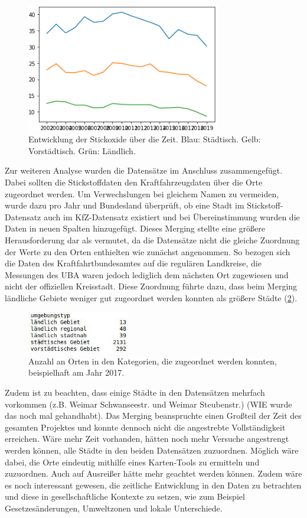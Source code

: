 \documentclass[11pt,a4paper,oneside,german]{article}
\begin{document}
	\begin{figure}[h!]
		\centering
		\includegraphics[width=8.5cm]{NO2Entwicklung.png}
		\caption{Entwicklung der Stickoxide über die Zeit. Blau: Städtisch. Gelb: Vorstädtisch. Grün: Ländlich.}
		\label{fig:NO2Entwicklung}
	\end{figure}
	
	Zur weiteren Analyse wurden die Datensätze im Anschluss zusammengefügt. Dabei sollten die Stickstoffdaten den Kraftfahrzeugdaten über die Orte zugeordnet werden. Um Verwechslungen bei gleichem Namen zu vermeiden, wurde dazu pro Jahr und Bundesland überprüft, ob eine Stadt im Stickstoff-Datensatz auch im KfZ-Datensatz existiert und bei Übereinstimmung wurden die Daten in neuen Spalten hinzugefügt. Dieses Merging stellte eine größere Herausforderung dar als vermutet, da die Datensätze nicht die gleiche Zuordnung der Werte zu den Orten enthielten wie zunächst angenommen. So bezogen sich die Daten des Kraftfahrtbundesamtes auf die regulären Landkreise, die Messungen des UBA waren jedoch lediglich dem nächsten Ort zugewiesen und nicht der offiziellen Kreisstadt. Diese Zuordnung führte dazu, dass beim Merging ländliche Gebiete weniger gut zugeordnet werden konnten als größere Städte (\ref{fig:Kategorien}).\\
	
	\begin{figure}[h!]
		\centering
		\includegraphics[width=4.5cm]{Kategorien.jpg}
		\caption{Anzahl an Orten in den Kategorien, die zugeordnet werden konnten, beispielhaft am Jahr 2017.}
		\label{fig:Kategorien}
	\end{figure}
	
	Zudem ist zu beachten, dass einige Städte in den Datensätzen mehrfach vorkommen (z.B. Weimar Schwanseestr. und Weimar Steubenstr.) (WIE wurde das noch mal gehandhabt). Das Merging beanspruchte einen Großteil der Zeit des gesamten Projektes und konnte dennoch nicht die angestrebte Vollständigkeit erreichen. Wäre mehr Zeit vorhanden, hätten noch mehr Versuche angestrengt werden können, alle Städte in den beiden Datensätzen zuzuordnen. Möglich wäre dabei, die Orte eindeutig mithilfe eines Karten-Tools zu ermitteln und zuzuordnen. Auch auf Ausreißer hätte mehr geachtet werden können. Zudem wäre es noch interessant gewesen, die zeitliche Entwicklung in den Daten zu betrachten und diese in gesellschaftliche Kontexte zu setzen, wie zum Beispiel Gesetzesänderungen, Umweltzonen und lokale Unterschiede.
	
\end{document}
